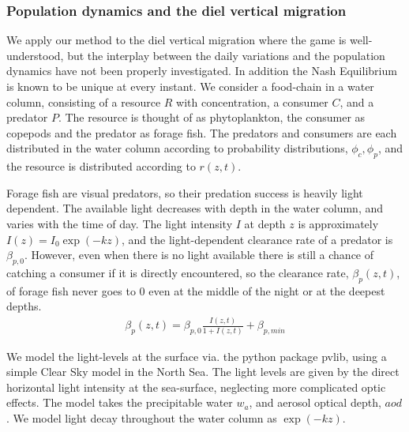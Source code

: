 
\subsubsection*{Population dynamics and the diel vertical migration}
We apply our method to the diel vertical migration where the game is well-understood, but the interplay between the daily variations and the population dynamics have not been properly investigated. In addition  the Nash Equilibrium is known to be unique \citep{verticalmigration} at every instant.
We consider a food-chain in a water column, consisting of a resource $R$ with concentration, a consumer $C$, and a predator $P$. The resource is thought of as phytoplankton, the consumer as copepods and the predator as forage fish. The predators and consumers are each distributed in the water column according to probability distributions, $\phi_c,\phi_p$, and the resource is distributed according to $r(z,t)$.


Forage fish are visual predators, so their predation success is heavily light dependent. The available light decreases with depth in the water column, and varies with the time of day.
The light intensity $I$ at depth $z$ is approximately $I(z) = I_0\exp(-kz)$, and the light-dependent clearance rate of a predator is $\beta_{p,0}$.  However, even when there is no light available there is still a chance of catching a consumer if it is directly encountered,  so the clearance rate, $\beta_p(z,t)$, of forage fish never goes to 0 even at the middle of the night or at the deepest depths.
\begin{align*}
  \beta_p(z,t) = \beta_{p,0} \frac{I(z,t)}{1+I(z,t)} + \beta_{p,min}
\end{align*}


We model the light-levels at the surface via. the python package pvlib, using a simple Clear Sky model in the North Sea. The light levels are given by the direct horizontal light intensity at the sea-surface, neglecting more complicated optic effects. The model takes the precipitable water $w_a$, and aerosol optical depth, $aod$. We model light decay throughout the water column as $\exp(-kz)$.


